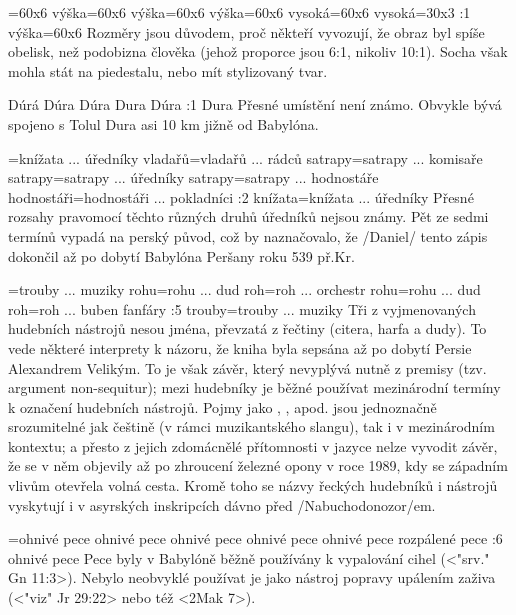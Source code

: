 ={60x6}  %
    {výška}={60x6} %
    {výška}={60x6}  %
    {výška}={60x6} %
    {vysoká}={60x6}  %
    {vysoká}={30x3}  %
:1 {výška}={60x6} Rozměry jsou důvodem, proč někteří vyvozují, že obraz byl spíše obelisk, než podobizna člověka (jehož proporce jsou 6:1, nikoliv 10:1). Socha však mohla stát na piedestalu, nebo mít stylizovaný tvar.

    {Dúrá} %
    {Dúra}  %
    {Dúra} %
    {Dura}  %
    {Dúra}  %
:1 {Dura} Přesné umístění není známo. Obvykle bývá spojeno s Tolul Dura asi 10 km jižně od Babylóna.

={knížata ... úředníky}  %
    {vladařů}={vladařů ... rádců} %
    {satrapy}={satrapy ... komisaře}  %
    {satrapy}={satrapy ... úředníky} %
    {satrapy}={satrapy ... hodnostáře}  %
    {hodnostáři}={hodnostáři ... pokladníci}  %
:2 {knížata}={knížata ... úředníky} Přesné rozsahy pravomocí těchto  různých druhů úředníků nejsou známy. Pět ze sedmi termínů vypadá na perský původ, což by naznačovalo, že \x/Daniel/ tento zápis dokončil až po dobytí Babylóna Peršany  roku 539 př.Kr.

={trouby ... muziky}  %
    {rohu}={rohu ... dud} %
    {roh}={roh ... orchestr}  %
    {rohu}={rohu ... dud} %
    {roh}={roh ... buben}  %
    {fanfáry}  %
:5 {trouby}={trouby ... muziky} Tři z vyjmenovaných  hudebních nástrojů  nesou jména, převzatá z řečtiny (citera, harfa a dudy). To vede některé interprety k názoru, že kniha byla sepsána až po dobytí Persie Alexandrem Velikým. 
To je však závěr, který nevyplývá nutně z premisy (tzv. argument non-sequitur); mezi hudebníky je běžné používat mezinárodní termíny k označení hudebních nástrojů. Pojmy jako  ,  ,  apod. jsou jednoznačně srozumitelné jak češtině (v rámci muzikantského slangu), tak i v mezinárodním kontextu; a přesto z jejich zdomácnělé přítomnosti v jazyce nelze vyvodit závěr, že se v něm objevily až po zhroucení železné opony v roce 1989, kdy se západním vlivům otevřela volná cesta. 
Kromě toho se názvy řeckých hudebníků i nástrojů vyskytují i v asyrských inskripcích dávno před \x/Nabuchodonozor/em. 


={ohnivé pece} %
    {ohnivé pece} %
    {ohnivé pece} %
    {ohnivé pece} %
    {ohnivé pece} %
    {rozpálené pece} %
:6 {ohnivé pece} Pece byly v Babylóně běžně používány k vypalování cihel  (<"srv." Gn 11:3>). Nebylo neobvyklé používat je jako nástroj popravy upálením zaživa (<"viz" Jr 29:22> nebo též <2Mak 7>).  

